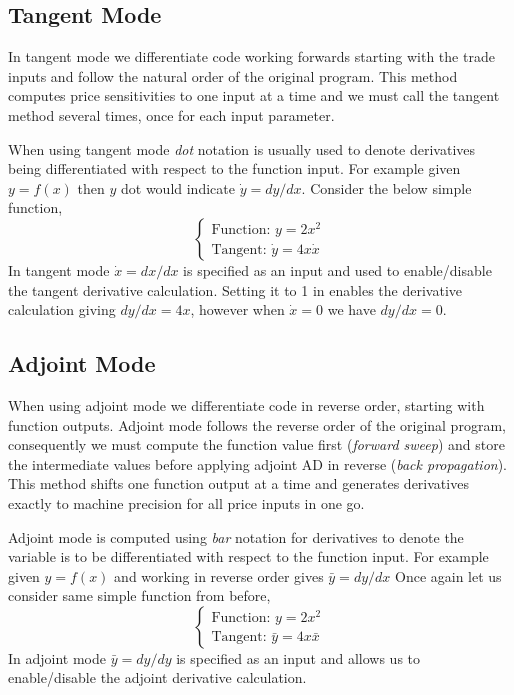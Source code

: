\documentclass[12pt,a4paper]{article}
\begin{document}
\subsection{Tangent Mode}
In tangent mode we differentiate code working forwards starting with the trade inputs and follow the natural order of the original program. This method computes price sensitivities to one input at a time and we must call the tangent method several times, once for each input parameter.

When using tangent mode \emph{dot} notation is usually used to denote derivatives being differentiated with respect to the function input. For example given $y = f(x)$ then $y$ dot would indicate $\dot{y} = dy/dx$.
Consider the below simple function,
\begin{equation}
\begin{cases}
\text{Function: } y = 2x^2\\
\text{Tangent: } \dot{y} = 4x\dot{x}
\end{cases}
\label{eq:aad_function}
\end{equation}
In tangent mode $\dot{x}=dx/dx$ is specified as an input and used to enable/disable the tangent derivative calculation. Setting it to 1 in enables the derivative calculation giving
$dy/dx = 4x$, however when $\dot{x}= 0$ we have $dy/dx = 0$.

\subsection{Adjoint Mode}
When using adjoint mode we differentiate code in reverse order, starting with function outputs. 
Adjoint mode follows the reverse order of the original program, consequently we must compute the function value first (\emph{forward sweep}) and store the intermediate values before applying adjoint AD in reverse (\emph{back propagation}). This method shifts one function output at a time and generates derivatives exactly to machine precision for all price inputs in one go.

Adjoint mode is computed using \emph{bar} notation for derivatives to denote the variable is to be differentiated with respect to the function input. For example given $y = f(x)$ and working in reverse order gives $\bar{y} = dy/dx$
Once again let us consider same simple function from before,
\begin{equation}
\begin{cases}
\text{Function: } y = 2x^2\\
\text{Tangent: } \bar{y} = 4x\bar{x}
\end{cases}
\end{equation}
In adjoint mode $\bar{y} = dy/dy$ is specified as an input and allows us to enable/disable the adjoint derivative calculation. 
\end{document}
